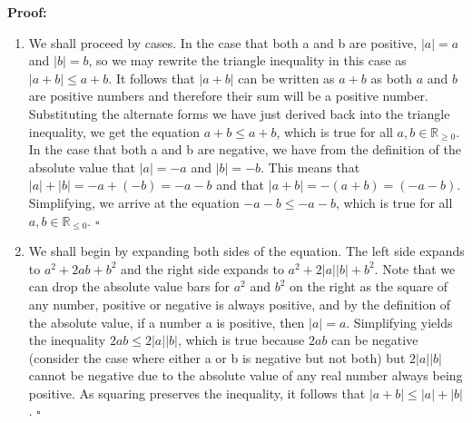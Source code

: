 \documentclass[12 pt]{article}
\newcommand{\qed}[0]{$\square$}
\begin{document}
\textbf{Proof:}
\begin{enumerate}
\item We shall proceed by cases. In the case that both a and b are positive, \(|a| = a\) and \(|b| = b\), so we may rewrite the triangle inequality in this case as  \(|a + b| \leq a + b\). It follows that \(|a + b|\) can be written as \(a + b\) as both \(a\) and \(b\) are positive numbers and therefore their sum will be a positive number. Substituting the alternate forms we have just derived back into the triangle inequality, we get the equation \(a + b \leq a + b\), which is true for all \(a, b \in \mathbb{R}_{\geq 0}\). In the case that both a and b are negative, we have from the definition of the absolute value that \(|a| = -a\) and \(|b| = -b\). This means that \(|a| + |b| = -a + (-b) = -a - b\) and that \(|a+b|= -(a+b) = (-a - b)\). Simplifying, we arrive at the equation \(-a -b \leq -a - b\), which is true for all \(a, b \in \mathbb{R}_{\leq 0}\). \qed

\item We shall begin by expanding both sides of the equation. The left side expands to $a^2 + 2ab + b^2$ and the right side expands to \(a^2 + 2|a||b| + b^2\). Note that we can drop the absolute value bars for \(a^2\) and \(b^2\) on the right as the square of any number, positive or negative is always positive, and by the definition of the absolute value, if a number a is positive, then \(|a| = a\). Simplifying yields the inequality \(2ab \leq 2|a||b|\), which is true because \(2ab\) can be negative (consider the case where either a or b is negative but not both) but \(2|a||b|\) cannot be negative due to the absolute value of any real number always being positive. As squaring preserves the inequality, it follows that \(|a + b| \leq |a| + |b|\). \qed

\end{enumerate}
\end{document}
